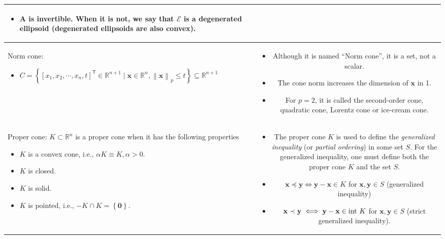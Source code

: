 \documentclass{article}
\newcommand{\trans}{\mathsf{T}}
\newcommand\norm[1]{\left\lVert#1\right\rVert}
\begin{document}
\begin{table}[ht!]
\begin{tabularx}{\textwidth}{|A|C|}
\begin{itemize}[leftmargin=*]
    \item \(\mathbf{A}\) is invertible. When it is not, we say that \(\mathcal{E}\) is a degenerated ellipsoid (degenerated ellipsoids are also convex).
\end{itemize}\\
\hline
Norm cone:
\begin{itemize}[leftmargin=*]
    \item \(C = \left\{ [x_1, x_2, \cdots, x_n, t]^\trans \in \mathbb{R}^{n+1} \mid \mathbf{x} \in \mathbb{R}^{n}, \norm{\mathbf{x}}_{p} \leq t \right\} \subseteq \mathbb{R}^{n+1}\)
\end{itemize} & \vspace{-3.5ex}
\begin{itemize}[leftmargin=*]
    \item Although it is named ``Norm cone'', it is a set, not a scalar.
    \item The cone norm increases the dimension of \(\mathbf{x}\) in 1.
    \item For \(p=2\), it is called the second-order cone, quadratic cone,  Lorentz cone or ice-cream cone.
\end{itemize} \\
\hline
Proper cone: \(K \subset \mathbb{R}^{n}\) is a proper cone when it has the following properties
\begin{itemize}
    \item \(K\) is a convex cone, i.e., \(\alpha K \equiv K, \alpha > 0\).
    \item \(K\) is closed.
    \item \(K\) is solid.
    \item \(K\) is pointed, i.e., \(-K \cap K = \left\{ \mathbf{0} \right\}\).
\end{itemize} & \vspace{-3.5ex} \begin{itemize}[leftmargin=*]
    \item The proper cone \(K\) is used to define the \emph{generalized inequality} (or \emph{partial ordering}) in some set \(S\). For the generalized inequality, one must define both the proper cone \(K\) and the set \(S\).
    \item \(\mathbf{x} \preceq \mathbf{y} \iff \mathbf{y} - \mathbf{x} \in K\) for \(\mathbf{x}, \mathbf{y} \in S\) (generalized inequality)
    \item \(\mathbf{x} \prec \mathbf{y} \iff \mathbf{y} - \mathbf{x} \in \textnormal{int }K\) for \(\mathbf{x}, \mathbf{y} \in S\) (strict generalized inequality).

\end{itemize}
\end{tabularx}
\end{table}
\end{document}
